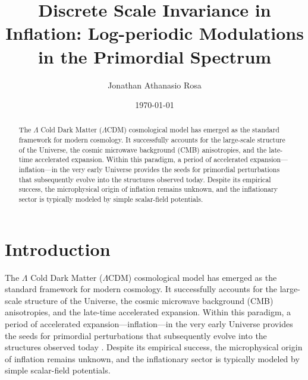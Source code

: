 \documentclass[reprint, amsmath, amssymb, aps, prd, nofootinbib]{revtex4-2}
\begin{document}
\title{Discrete Scale Invariance in Inflation: Log-periodic Modulations in the Primordial Spectrum}

\author{Jonathan Athanasio Rosa}
\date{\today}

\begin{abstract}
The $\Lambda$ Cold Dark Matter ($\Lambda$CDM) cosmological model has emerged as the
standard framework for modern cosmology. It successfully accounts for the large-scale
structure of the Universe, the cosmic microwave background (CMB) anisotropies, and the
late-time accelerated expansion. Within this paradigm, a period of accelerated
expansion---inflation---in the very early Universe provides the seeds for primordial
perturbations that subsequently evolve into the structures observed today. Despite its
empirical success, the microphysical origin of inflation remains unknown, and the
inflationary sector is typically modeled by simple scalar-field potentials.
\end{abstract}
\maketitle

\section{Introduction}

The $\Lambda$ Cold Dark Matter ($\Lambda$CDM) cosmological model has emerged as the
standard framework for modern cosmology. It successfully accounts for the large-scale
structure of the Universe, the cosmic microwave background (CMB) anisotropies, and the
late-time accelerated expansion. Within this paradigm, a period of accelerated
expansion---inflation---in the very early Universe provides the seeds for primordial
perturbations that subsequently evolve into the structures observed today
\cite{Planck2018}. Despite its empirical success, the microphysical origin of inflation
remains unknown, and the inflationary sector is typically modeled by simple scalar-field
potentials.
\end{document}
